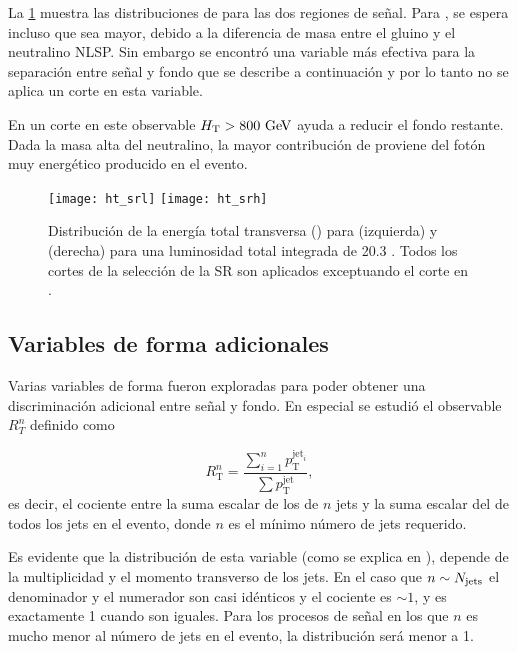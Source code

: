 La \cref{fig:opt_ht} muestra las distribuciones de {\HT} para las dos regiones de señal.
Para {\SRL}, se espera incluso que {\HT} sea mayor, debido a la
diferencia de masa entre el gluino y el neutralino NLSP. Sin embargo
se encontró una variable más efectiva para la separación entre señal y
fondo que se describe a continuación y por lo tanto no se aplica un corte
en esta variable.

En {\SRH} un corte en este observable $\HT>800\gev$ ayuda a reducir el fondo restante.
Dada la masa alta del neutralino, la mayor contribución de {\HT} proviene
del fotón muy energético producido en el evento.


\begin{figure}[!h]
  \centering

  \texttt{[image: ht\_srl]}
  \texttt{[image: ht\_srh]}

  \caption{Distribución de la energía total transversa (\HT) para {\SRL} (izquierda)
    y {\SRH} (derecha) para una luminosidad total integrada de 20.3 \ifb. Todos los cortes de la selección
  de la SR son aplicados exceptuando el corte en {\HT}.}
  \label{fig:opt_ht}
\end{figure}



\subsection{Variables de forma adicionales}\label{sec:shape_vars}

Varias variables de forma fueron exploradas para poder obtener
una discriminación adicional entre señal y fondo. En especial se estudió el
observable $R_T^n$ definido como

\begin{equation}\label{eq:rt_formula}
  R_\mathrm{T}^{n} = \frac{\sum_{i=1}^{n}p_\mathrm{T}^{\text{jet}_i}}{\sum p_\mathrm{T}^{\text{jet}}},
\end{equation}
%
es decir, el cociente entre la suma escalar de los {\pt} de $n$ jets y la suma
escalar del {\pt} de todos los jets en el evento, donde $n$ es el mínimo número
de jets requerido.

Es evidente que la distribución de esta variable (como se explica en
\cite{PhysRevD.84.055010}), depende de la multiplicidad y el momento transverso
de los jets. En el caso que $n \sim N_\mathrm{jets}$ el denominador y el
numerador son casi idénticos y el cociente es $\sim 1$, y es exactamente 1
cuando son iguales.
Para los procesos de señal en los que $n$ es mucho menor al número de jets en el
evento, la distribución será menor a 1.


